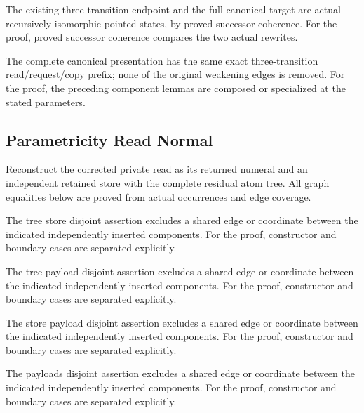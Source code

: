 The existing three-transition endpoint and the full canonical target are actual recursively isomorphic pointed states, by proved successor coherence.
For the proof, proved successor coherence compares the two actual rewrites.
\par{}

The complete canonical presentation has the same exact three-transition read/request/copy prefix; none of the original weakening edges is removed.
For the proof, the preceding component lemmas are composed or specialized at the stated parameters.
\par{}

\subsection{Parametricity Read Normal}
Reconstruct the corrected private read as its returned numeral and an independent retained store with the complete residual atom tree. All graph equalities below are proved from actual occurrences and edge coverage.

The tree store disjoint assertion excludes a shared edge or coordinate between the indicated independently inserted components.
For the proof, constructor and boundary cases are separated explicitly.
\par{}

The tree payload disjoint assertion excludes a shared edge or coordinate between the indicated independently inserted components.
For the proof, constructor and boundary cases are separated explicitly.
\par{}

The store payload disjoint assertion excludes a shared edge or coordinate between the indicated independently inserted components.
For the proof, constructor and boundary cases are separated explicitly.
\par{}

The payloads disjoint assertion excludes a shared edge or coordinate between the indicated independently inserted components.
For the proof, constructor and boundary cases are separated explicitly.
\par{}

